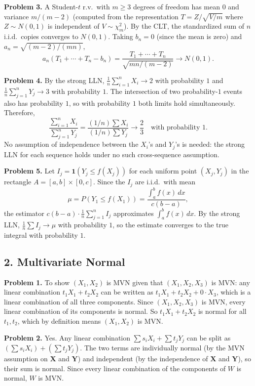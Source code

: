 \documentclass{article}
\begin{document}
\bigskip
\textbf{Problem 3.} A Student-$t$ r.v.\ with $m\ge3$ degrees of freedom has mean $0$ and variance $m/(m-2)$ (computed from the representation $T=Z/\sqrt{V/m}$ where $Z\sim N(0,1)$ is independent of $V\sim\chi^2_m$). By the CLT, the standardized sum of $n$ i.i.d.\ copies converges to $N(0,1)$. Taking $b_n=0$ (since the mean is zero) and $a_n=\sqrt{(m-2)/(mn)}$,
$$
a_n(T_1+\cdots+T_n-b_n)=\frac{T_1+\cdots+T_n}{\sqrt{mn/(m-2)}}\to N(0,1).
$$

\bigskip
\textbf{Problem 4.} By the strong LLN, $\frac{1}{n}\sum_{i=1}^n X_i\to2$ with probability $1$ and $\frac{1}{n}\sum_{j=1}^n Y_j\to3$ with probability $1$. The intersection of two probability-$1$ events also has probability $1$, so with probability $1$ both limits hold simultaneously. Therefore,
$$
\frac{\sum_{i=1}^n X_i}{\sum_{j=1}^n Y_j}=\frac{(1/n)\sum X_i}{(1/n)\sum Y_j}\to\frac{2}{3}\quad\text{with probability }1.
$$
No assumption of independence between the $X_i$'s and $Y_j$'s is needed: the strong LLN for each sequence holds under no such cross-sequence assumption.

\bigskip
\textbf{Problem 5.} Let $I_j=\mathbf{1}(Y_j\le f(X_j))$ for each uniform point $(X_j,Y_j)$ in the rectangle $A=[a,b]\times[0,c]$. Since the $I_j$ are i.i.d.\ with mean
$$
\mu=P(Y_1\le f(X_1))=\frac{\int_a^b f(x)\,dx}{c(b-a)},
$$
the estimator $c(b-a)\cdot\frac{1}{n}\sum_{j=1}^n I_j$ approximates $\int_a^b f(x)\,dx$. By the strong LLN, $\frac{1}{n}\sum I_j\to\mu$ with probability $1$, so the estimate converges to the true integral with probability $1$.

\subsection*{2. Multivariate Normal}

\textbf{Problem 1.} To show $(X_1,X_2)$ is MVN given that $(X_1,X_2,X_3)$ is MVN: any linear combination $t_1X_1+t_2X_2$ can be written as $t_1X_1+t_2X_2+0\cdot X_3$, which is a linear combination of all three components. Since $(X_1,X_2,X_3)$ is MVN, every linear combination of its components is normal. So $t_1X_1+t_2X_2$ is normal for all $t_1,t_2$, which by definition means $(X_1,X_2)$ is MVN.

\bigskip
\textbf{Problem 2.} Yes. Any linear combination $\sum s_i X_i+\sum t_j Y_j$ can be split as $(\sum s_i X_i)+(\sum t_j Y_j)$. The two terms are individually normal (by the MVN assumption on $\mathbf{X}$ and $\mathbf{Y}$) and independent (by the independence of $\mathbf{X}$ and $\mathbf{Y}$), so their sum is normal. Since every linear combination of the components of $W$ is normal, $W$ is MVN.
\end{document}
